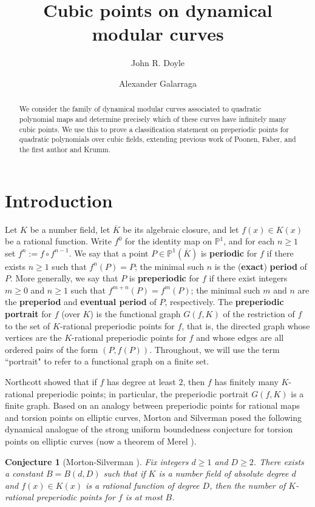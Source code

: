 \documentclass[12pt]{amsart}
\title{Cubic points on dynamical modular curves}
\author{John R. Doyle}
\author{Alexander Galarraga}
\newtheorem{conj}[thm]{Conjecture}
\theoremstyle{definition}
\newcommand{\bbP}{\mathbb{P}}
\newcommand{\Kbar}{\overline{K}}
\numberwithin{equation}{section}
\begin{document}
\maketitle

\begin{abstract}
    We consider the family of dynamical modular curves associated to quadratic polynomial maps and determine precisely which of these curves have infinitely many cubic points. We use this to prove a classification statement on preperiodic points for quadratic polynomials over cubic fields, extending previous work of Poonen, Faber, and the first author and Krumm.
\end{abstract}

\section{Introduction}\label{sec:intro}

Let $K$ be a number field, let $\Kbar$ be its algebraic closure, and let $f(x) \in K(x)$ be a rational function. Write $f^0$ for the identity map on $\bbP^1$, and for each $n \ge 1$ set $f^n := f \circ f^{n-1}$. We say that a point $P \in \bbP^1(\Kbar)$ is {\bf periodic} for $f$ if there exists $n \ge 1$ such that $f^n(P) = P$; the minimal such $n$ is the ({\bf exact}) {\bf period} of $P$. More generally, we say that $P$ is {\bf preperiodic} for $f$ if there exist integers $m \ge 0$ and $n \ge 1$ such that $f^{m+n}(P) = f^m(P)$; the minimal such $m$ and $n$ are the {\bf preperiod} and {\bf eventual period} of $P$, respectively. The {\bf preperiodic portrait} for $f$ (over $K$) is the functional graph $G(f,K)$ of the restriction of $f$ to the set of $K$-rational preperiodic points for $f$, that is, the directed graph whose vertices are the $K$-rational preperiodic points for $f$ and whose edges are all ordered pairs of the form $(P, f(P))$. Throughout, we will use the term ``portrait" to refer to a functional graph on a finite set.

Northcott \cite{northcott:1950} showed that if $f$ has degree at least $2$, then $f$ has finitely many $K$-rational preperiodic points; in particular, the preperiodic portrait $G(f,K)$ is a finite graph. Based on an analogy between preperiodic points for rational maps and torsion points on elliptic curves, Morton and Silverman posed the following dynamical analogue of the strong uniform boundedness conjecture for torsion points on elliptic curves (now a theorem of Merel \cite{merel:1996}).

\begin{conj}[{Morton-Silverman \cite[p. 100]{morton/silverman:1994}}]\label{conj:ubc}
Fix integers $d \ge 1$ and $D \ge 2$. There exists a constant $B = B(d,D)$ such that if $K$ is a number field of absolute degree $d$ and $f(x) \in K(x)$ is a rational function of degree $D$, then the number of $K$-rational preperiodic points for $f$ is at most $B$.
\end{conj}
\end{document}
